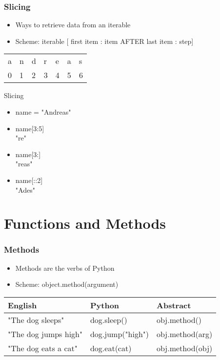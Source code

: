 \documentclass[]{beamer}
\newcommand\Fontlarge{\fontsize{12}{30.4}\selectfont}
\begin{document}
\begin{frame}
\frametitle{Slicing}

\begin{itemize}
\item Ways to retrieve data from an iterable
\item Scheme: iterable [ first item : item AFTER last item : step] 
\end{itemize}
 
\begin{table}[h]
\begin{tabular}{lllllll}
a & n & d & r & e & a & s \\
0 & 1 & 2 & 3 & 4 & 5 & 6
\end{tabular}
\end{table} 
 
\begin{block}{Slicing}
\begin{itemize}
\item name = "Andreas"
\item name[3:5]
\\ "re"
\item name[3:]
\\ "reas"
\item name[::2]
\\ "Ades"
\end{itemize}
\end{block}

\end{frame}

\section{Functions and Methods}

\begin{frame}
\frametitle{Methods}

\begin{itemize}
\item Methods are the verbs of Python
\item Scheme: object.method(argument)
 
\end{itemize}

\Fontlarge

\begin{table}[h]
\begin{tabular}{lll}
\textbf{English} & \textbf{Python}  & \textbf{Abstract} \\ \hline
"The dog sleeps"       & dog.sleep()      & obj.method()      \\ \hline
"The dog jumps high"   & dog.jump("high") & obj.method(arg)   \\ \hline
"The dog eats a cat"   & dog.eat(cat)     & obj.method(obj)  
\end{tabular}
\end{table}


\end{frame}
\end{document}
